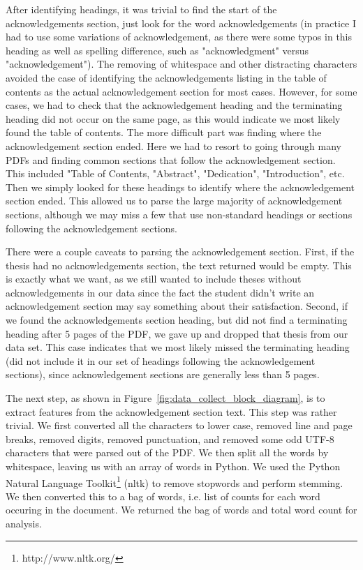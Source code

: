 After identifying headings, it was trivial to find the start of the acknowledgements section, just look for the word acknowledgements (in practice I had to use some variations of acknowledgement, as there were some typos in this heading as well as spelling difference, such as "acknowledgment" versus "acknowledgement").  The removing of whitespace and other distracting characters avoided the case of identifying the acknowledgements listing in the table of contents as the actual acknowledgement section for most cases.  However, for some cases, we had to check that the acknowledgement heading and the terminating heading did not occur on the same page, as this would indicate we most likely found the table of contents.  The more difficult part was finding where the acknowledgement section ended.  Here we had to resort to going through many PDFs and finding common sections that follow the acknowledgement section.  This included "Table of Contents, "Abstract", "Dedication", "Introduction", etc.  Then we simply looked for these headings to identify where the acknowledgement section ended.  This allowed us to parse the large majority of acknowledgement sections, although we may miss a few that use non-standard headings or sections following the acknowledgement sections.

There were a couple caveats to parsing the acknowledgement section.  First, if the thesis had no acknowledgements section, the text returned would be empty.  This is exactly what we want, as we still wanted to include theses without acknowledgements in our data since the fact the student didn't write an acknowledgement section may say something about their satisfaction.  Second, if we found the acknowledgements section heading, but did not find a terminating heading after 5 pages of the PDF, we gave up and dropped that thesis from our data set.  This case indicates that we most likely missed the terminating heading (did not include it in our set of headings following the acknowledgement sections), since acknowledgement sections are generally less than 5 pages.  

The next step, as shown in Figure~\ref{fig:data_collect_block_diagram}, is to extract features from the acknowledgement section text.  This step was rather trivial.  We first converted all the characters to lower case, removed line and page breaks, removed digits, removed punctuation, and removed some odd UTF-8 characters that were parsed out of the PDF.  We then split all the words by whitespace, leaving us with an array of words in Python.  We used the Python Natural Language Toolkit\footnote{http://www.nltk.org/} (nltk) to remove stopwords and perform stemming.  We then converted this to a bag of words, i.e. list of counts for each word occuring in the document.  We returned the bag of words and total word count for analysis.